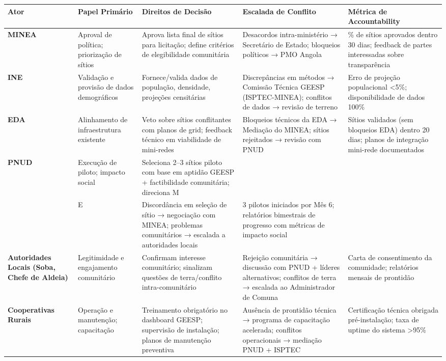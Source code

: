 \documentclass[12pt, a4paper]{article}
\begin{document}
\begin{table}[h!]
\centering
\renewcommand{\arraystretch}{1.35}
\begin{tabularx}{\textwidth}{|l|l|l|l|l|}
\hline
\textbf{Ator} & \textbf{Papel Primário} & \textbf{Direitos de Decisão} & \textbf{Escalada de Conflito} & \textbf{Métrica de Accountability} \\
\hline
\textbf{MINEA} & Aproval de política; priorização de sítios & Aprova lista final de sítios para licitação; define critérios de elegibilidade comunitária & Desacordos intra-ministério → Secretário de Estado; bloqueios políticos → PMO Angola & \% de sítios aprovados dentro 30 dias; feedback de partes interessadas sobre transparência \\
\hline
\textbf{INE} & Validação e provisão de dados demográficos & Fornece/valida dados de população, densidade, projeções censitárias & Discrepâncias em métodos → Comissão Técnica GEESP (ISPTEC-MINEA); conflitos de dados → revisão de terreno & Erro de projeção populacional <5\%; disponibilidade de dados 100\% \\
\hline
\textbf{EDA} & Alinhamento de infraestrutura existente & Veto sobre sítios conflitantes com planos de grid; feedback técnico em viabilidade de mini-redes & Bloqueios técnicos da EDA → Mediação do MINEA; sítios rejeitados → revisão com PNUD & Sítios validados (sem bloqueios EDA) dentro 20 dias; planos de integração mini-rede documentados \\
\hline
\textbf{PNUD} & Execução de piloto; impacto social & Seleciona 2--3 sítios piloto com base em aptidão GEESP + factibilidade comunitária; direciona M\\&E & Discordância em seleção de sítio → negociação com MINEA; problemas comunitários → escalada a autoridades locais & 3 pilotos iniciados por Mês 6; relatórios bimestrais de progresso com métricas de impacto social \\
\hline
\textbf{Autoridades Locais (Soba, Chefe de Aldeia)} & Legitimidade e engajamento comunitário & Confirmam interesse comunitário; sinalizam questões de terra/conflito intra-comunitário & Rejeição comunitária → discussão com PNUD + líderes alternativos; conflitos de terra → escalada ao Administrador de Comuna & Carta de consentimento da comunidade; relatórios mensais de prontidão \\
\hline
\textbf{Cooperativas Rurais} & Operação e manutenção; capacitação & Treinamento obrigatório no dashboard GEESP; supervisão de instalação; planos de manutenção preventiva & Ausência de prontidão técnica → programa de capacitação acelerada; conflitos operacionais → mediação PNUD + ISPTEC & Certificação técnica obrigada pré-instalação; taxa de uptime do sistema >95\% \\

\end{tabularx}
\end{table}
\end{document}
